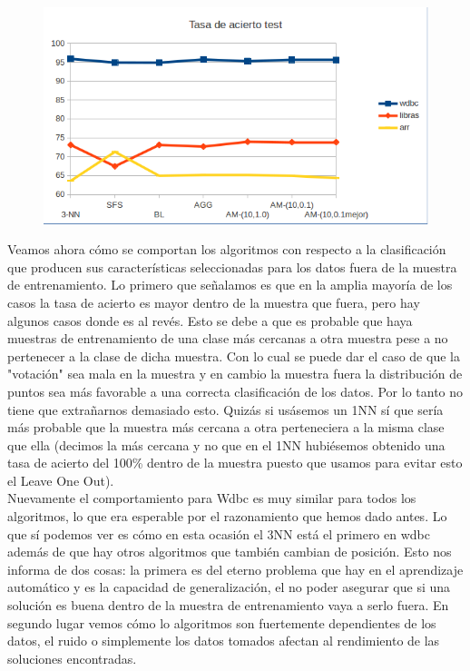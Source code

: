 \documentclass[10pt,a4paper]{article}
\begin{document}
\begin{figure}[H]
\centering
\includegraphics[width=130mm]{tasa_test_am.png}
\end{figure}

Veamos ahora cómo se comportan los algoritmos con respecto a la clasificación que producen sus características seleccionadas para los datos fuera de la muestra de entrenamiento. Lo primero que señalamos es que en la amplia mayoría de los casos la tasa de acierto es mayor dentro de la muestra que fuera, pero hay algunos casos donde es al revés. Esto se debe a que es probable que haya muestras de entrenamiento de una clase más cercanas a otra muestra pese a no pertenecer a la clase de dicha muestra. Con lo cual se puede dar el caso de que la "votación" sea mala en la muestra y en cambio la muestra fuera la distribución de puntos sea más favorable a una correcta clasificación de los datos. Por lo tanto no tiene que extrañarnos demasiado esto. Quizás si usásemos un 1NN sí que sería más probable que la muestra más cercana a otra perteneciera a la misma clase que ella (decimos la más cercana y no que en el 1NN hubiésemos obtenido una tasa de acierto del 100\% dentro de la muestra puesto que usamos para evitar esto el Leave One Out).\\

Nuevamente el comportamiento para Wdbc es muy similar para todos los algoritmos, lo que era esperable por el razonamiento que hemos dado antes. Lo que sí podemos ver es cómo en esta ocasión el 3NN está el primero en wdbc además de que hay otros algoritmos que también cambian de posición. Esto nos informa de dos cosas: la primera es del eterno problema que hay en el aprendizaje automático y es la capacidad de generalización, el no poder asegurar que si una solución es buena dentro de la muestra de entrenamiento vaya a serlo fuera. En segundo lugar vemos cómo lo algoritmos son fuertemente dependientes de los datos, el ruido o simplemente los datos tomados afectan al rendimiento de las soluciones encontradas.\\
\end{document}
